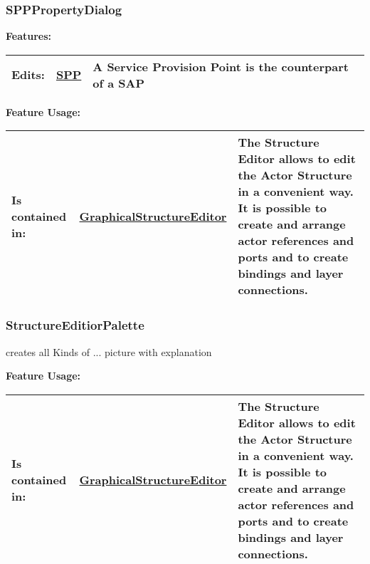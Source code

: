 		
	\vspace{\baselineskip}
	\vspace{\baselineskip}
	\vspace{\baselineskip}
	
	\subsubsection{SPPPropertyDialog}
		\hypertarget{ref:SPPPropertyDialog}{}
		
		
		
		
		\begingroup
		\textbf{Features:}
		\renewcommand{\arraystretch}{1.8} %
		\begin{longtable}{l|l p{}}
			\hline
		Edits: & \tabitem \hyperlink{ref:SPP}{SPP}  & A Service Provision Point is the counterpart of a SAP\\
		\hline
		\end{longtable}
		\endgroup
		
		\begingroup
		\textbf{Feature Usage:}
		\renewcommand{\arraystretch}{1.8} %
		\begin{longtable}{l|l p{}}
			\hline
		Is contained in: & \tabitem \hyperlink{ref:GraphicalStructureEditor}{GraphicalStructureEditor}  & The Structure Editor allows to edit the Actor Structure in a convenient way. It is possible to create and arrange actor references and ports and to create bindings and layer connections.\\
		\hline
		\end{longtable}
		\endgroup
		
		
	\vspace{\baselineskip}
	\vspace{\baselineskip}
	\vspace{\baselineskip}
	
	\subsubsection{StructureEditiorPalette}
		\hypertarget{ref:StructureEditiorPalette}{}
		
		creates all Kinds of ...  picture with explanation
		
		
		
		
		\begingroup
		\textbf{Feature Usage:}
		\renewcommand{\arraystretch}{1.8} %
		\begin{longtable}{l|l p{}}
			\hline
		Is contained in: & \tabitem \hyperlink{ref:GraphicalStructureEditor}{GraphicalStructureEditor}  & The Structure Editor allows to edit the Actor Structure in a convenient way. It is possible to create and arrange actor references and ports and to create bindings and layer connections.\\
		\hline
		\end{longtable}
		\endgroup
		
